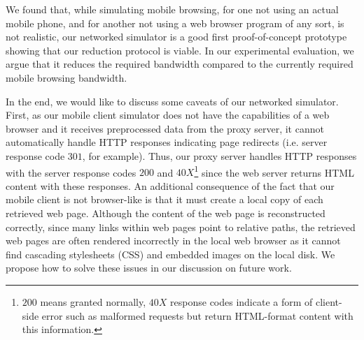 We found that, while simulating mobile browsing, for one not using an actual mobile phone, and for another not using a web browser program of any sort, is not realistic, our networked simulator is a good first proof-of-concept prototype showing that our reduction protocol is viable. In our experimental evaluation, we argue that it reduces the required bandwidth compared to the currently required mobile browsing bandwidth.

In the end, we would like to discuss some caveats of our networked simulator. First, as our mobile client simulator does not have the capabilities of a web browser and it receives preprocessed data from the proxy server, it cannot automatically handle HTTP responses indicating page redirects (i.e. server response code $301$, for example). Thus, our proxy server handles HTTP responses with the server response codes $200$ and $40X$\footnote{$200$ means granted normally, $40X$ response codes indicate a form of client-side error such as malformed requests but return HTML-format content with this information.} since the web server returns HTML content with these responses. An additional consequence of the fact that our mobile client is not browser-like is that it must create a local copy of each retrieved web page. Although the content of the web page is reconstructed correctly, since many links within web pages point to relative paths, the retrieved web pages are often rendered incorrectly in the local web browser as it cannot find cascading stylesheets (CSS) and embedded images on the local disk. We propose how to solve these issues in our discussion on future work.
